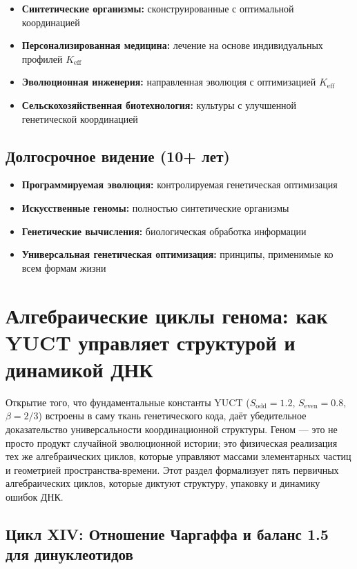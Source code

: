 \documentclass[12pt]{article}
\begin{document}
	\begin{itemize}
		\item \textbf{Синтетические организмы:} сконструированные с оптимальной координацией
		\item \textbf{Персонализированная медицина:} лечение на основе индивидуальных профилей $K_{\text{eff}}$
		\item \textbf{Эволюционная инженерия:} направленная эволюция с оптимизацией $K_{\text{eff}}$
		\item \textbf{Сельскохозяйственная биотехнология:} культуры с улучшенной генетической координацией
	\end{itemize}
	
	\subsection{Долгосрочное видение (10+ лет)}
	
	\begin{itemize}
		\item \textbf{Программируемая эволюция:} контролируемая генетическая оптимизация
		\item \textbf{Искусственные геномы:} полностью синтетические организмы
		\item \textbf{Генетические вычисления:} биологическая обработка информации
		\item \textbf{Универсальная генетическая оптимизация:} принципы, применимые ко всем формам жизни
	\end{itemize}
	
	\section{Алгебраические циклы генома: как YUCT управляет структурой и динамикой ДНК}
	\label{sec:genetic-loops}
	
	Открытие того, что фундаментальные константы YUCT ($S_{\mathrm{odd}} = 1.2$, $S_{\mathrm{even}} = 0.8$, $\beta = 2/3$) встроены в саму ткань генетического кода, даёт убедительное доказательство универсальности координационной структуры. Геном — это не просто продукт случайной эволюционной истории; это физическая реализация тех же алгебраических циклов, которые управляют массами элементарных частиц и геометрией пространства-времени. Этот раздел формализует пять первичных алгебраических циклов, которые диктуют структуру, упаковку и динамику ошибок ДНК.
	
	\subsection{Цикл XIV: Отношение Чаргаффа и баланс 1.5 для динуклеотидов}
	
\end{document}
